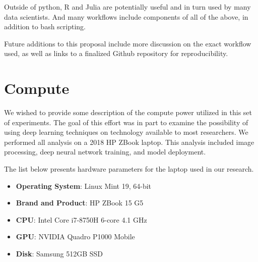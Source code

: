Outside of python, R and Julia are potentially useful and in turn used by many data scientists.
And many workflows include components of all of the above, in addition to bash scripting.

Future additions to this proposal include more discussion on the exact workflow used, as well as links to a finalized Github repository for reproducibility. 

\section{Compute}
\label{ssec:appendix-a-compute}

We wished to provide some description of the compute power utilized in this set of experiments.
The goal of this effort was in part to examine the possibility of using deep learning techniques on technology available to most researchers. 
We performed all analysis on a 2018 HP ZBook laptop.
This analysis included image processing, deep neural network training, and model deployment.

The list below presents hardware parameters for the laptop used in our research.

\begin{itemize}
	\item \textbf{Operating System}: Linux Mint 19, 64-bit
	\item \textbf{Brand and Product}: HP ZBook 15 G5
	\item \textbf{CPU}: Intel Core i7-8750H 6-core 4.1 GHz
	\item \textbf{GPU}: NVIDIA Quadro P1000 Mobile
	\item \textbf{Disk}: Samsung 512GB SSD
\end{itemize}